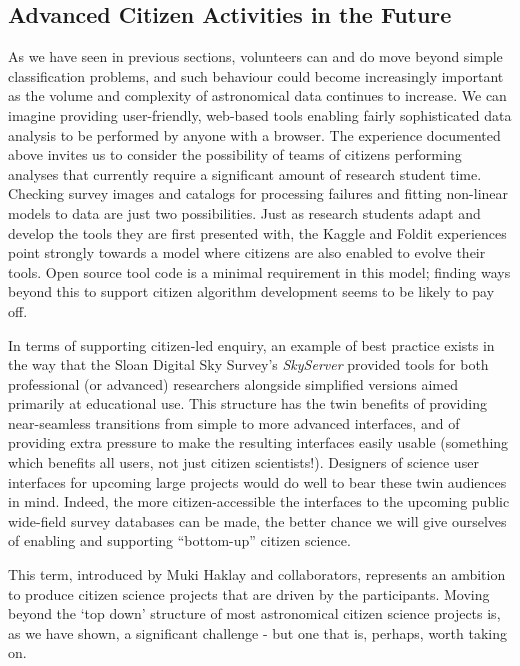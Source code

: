 \documentclass{ar2e}
\begin{document}
\subsection{Advanced Citizen Activities in the Future}

As we have seen in previous sections, volunteers can and do move beyond simple
classification problems, and such behaviour could become increasingly important
as the volume and complexity of astronomical data continues to increase.  We can
imagine providing user-friendly, web-based tools enabling  fairly sophisticated
data analysis to be performed by anyone with a browser. The experience
documented above invites us to consider the possibility of teams of citizens 
performing analyses that currently require a significant amount of research
student time.  Checking survey images and catalogs  for processing failures and
fitting non-linear models to data are just two possibilities. Just as research
students adapt and develop the tools they are first presented with, the Kaggle
and Foldit experiences point strongly towards a model where citizens are also
enabled to evolve their tools. Open source tool code is a minimal requirement in
this model; finding ways beyond this to support citizen algorithm development
seems to be likely to pay off.

In terms of supporting citizen-led enquiry, an example of best practice exists
in the way that the Sloan Digital Sky Survey's \emph{SkyServer} provided tools
for both professional (or advanced) researchers alongside simplified versions
aimed primarily at educational use. This structure has the twin benefits of
providing near-seamless transitions from simple to more advanced interfaces, and
of providing extra pressure to make the resulting interfaces easily usable 
(something which benefits all users, not just citizen scientists!). Designers of
science user interfaces for upcoming large projects would do well to bear these
twin audiences in mind. Indeed, the more citizen-accessible the interfaces to
the upcoming public wide-field survey databases can be made, the better chance
we will give ourselves of enabling and supporting ``bottom-up'' citizen
science.  

This term, introduced by Muki Haklay and collaborators, represents an ambition to produce
citizen science projects that are driven by the participants. Moving beyond the `top down'
structure of most astronomical citizen science projects is, as we have shown, a significant
challenge - but one that is, perhaps, worth taking on. 
\end{document}

